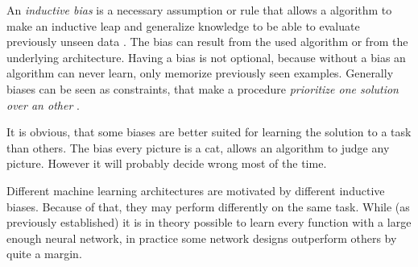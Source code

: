 An \emph{inductive bias} is a necessary assumption or rule that allows a algorithm to make an inductive leap and generalize knowledge to be able to evaluate previously unseen data \cite{needForBias}.
The bias can result from the used algorithm or from the underlying architecture.
Having a bias is not optional, because without a bias an algorithm can never \glqq learn\grqq{}, only memorize previously seen examples.
Generally biases can be seen as constraints, that make a procedure \emph{prioritize one solution over an other} \cite[]{relationalInductiveBiasesAndGraphNetworks}. 

It is obvious, that some biases are better suited for learning the solution to a task than others. 
The bias \glqq every picture is a cat\grqq{}, allows an algorithm to judge any picture. 
However it will probably decide wrong most of the time.

Different machine learning architectures are motivated by different inductive biases. 
Because of that, they may perform differently on the same task.
While (as previously established) it is in theory possible to learn every function with a large enough neural network, in practice some network designs outperform others by quite a margin.